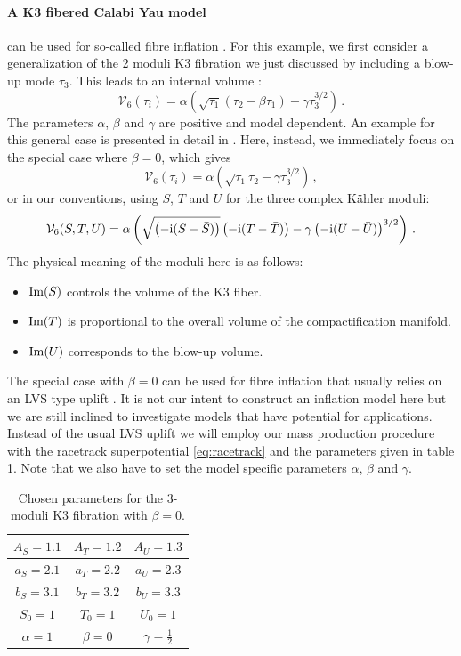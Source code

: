 \documentclass[a4paper,12pt,twoside,openright]{report}
\newcommand{\be}{\begin{equation}}
\newcommand{\ee}{\end{equation}}
\def\rmi{{\rm i}}
\def\rmim{{\rm Im}}
\begin{document}
\paragraph{A K3 fibered Calabi Yau model} can be used for so-called fibre inflation \cite{Cicoli:2008gp,Burgess:2016owb,Kallosh:2017wku}. For this example, we first consider a generalization of the 2 moduli K3 fibration we just discussed by including a blow-up mode $\tau_3$. This leads to an internal volume \cite{Cicoli:2008gp}:
\be 
\mathcal{V}_6 (\tau_i) = \alpha \left( \sqrt{\tau_1} (\tau_2 - \beta \tau_1 ) - \gamma \tau_3^{3/2} \right)\,.
\ee
The parameters $\alpha$, $\beta$ and $\gamma$ are positive and model dependent. An example for this general case is presented in detail in \cite{Cribiori:2019drf}. Here, instead, we immediately focus on the special case where $\beta = 0$, which gives
\be 
\mathcal{V}_6 (\tau_i) = \alpha \left( \sqrt{\tau_1} \tau_2  - \gamma \tau_3^{3/2} \right)\,,
\ee
or in our conventions, using $S$, $T$ and $U$ for the three complex Kähler moduli:
\be 
\mathcal{V}_6 (S,T,U) = \alpha \left( \sqrt{\left(-\rmi ( S- \bar{S})\right)} \left(-\rmi (T-\bar{T})\right) - \gamma \left(-\rmi (U-\bar{U})\right)^{3/2} \right)\,.
\ee
The physical meaning of the moduli here is as follows:
\begin{itemize}
\item $\rmim(S)$ controls the volume of the K3 fiber.
\item $\rmim(T)$ is proportional to the overall volume of the compactification manifold.
\item $\rmim(U)$ corresponds to the blow-up volume.
\end{itemize}
The special case with $\beta=0$ can be used for fibre inflation that usually relies on an LVS type uplift \cite{Balasubramanian:2005zx}. It is not our intent to construct an inflation model here but we are still inclined to investigate models that have potential for applications. Instead of the usual LVS uplift we will employ our mass production procedure with the racetrack superpotential \eqref{eq:racetrack} and the parameters given in table \ref{tab:fibrepara}. Note that we also have to set the model specific parameters $\alpha$, $\beta$ and $\gamma$.
\begin{table}[htb]
\centering
\begin{tabular}{|c|c|c|}\hline
$A_S = 1.1$ & $A_T = 1.2$ & $A_U =1.3$\\\hline
$a_S = 2.1$ & $a_T = 2.2$ & $a_U = 2.3$\\\hline
$b_S = 3.1$ & $b_T = 3.2$ & $b_U = 3.3$\\\hline
$S_0 = 1$ & $T_0 = 1$ & $U_0 = 1$\\\hline
$\alpha = 1$ & $\beta=0$ & $\gamma = \frac{1}{2} $ \\\hline
\end{tabular}
\caption{  Chosen parameters for the 3-moduli K3 fibration with $\beta = 0$.}
\label{tab:fibrepara}
\end{table}
\end{document}
